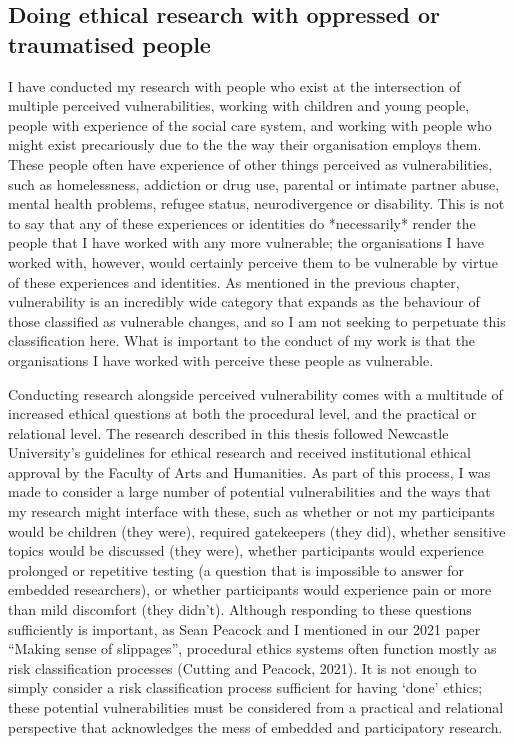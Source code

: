 \subsection{Doing ethical research with oppressed or traumatised people}
I have conducted my research with people who exist at the intersection of multiple perceived vulnerabilities, working with children and young people, people with experience of the social care system, and working with people who might exist precariously due to the the way their organisation employs them. These people often have experience of other things  perceived as vulnerabilities, such as homelessness,  addiction or drug use, parental or intimate partner abuse, mental health problems, refugee status, neurodivergence or disability. This is not to say that any of these experiences or identities do *necessarily* render the people that I have worked with any more vulnerable; the organisations I have worked with, however, would certainly perceive them to be vulnerable by virtue of these experiences and identities. As mentioned in the previous chapter, vulnerability is an incredibly wide category that expands as the behaviour of those classified as vulnerable changes, and so I am not seeking to perpetuate this classification here. What is important to the conduct of my work is that the organisations I have worked with perceive these people as vulnerable. 

Conducting research alongside perceived vulnerability comes with a multitude of increased ethical questions at both the procedural level, and the practical or relational level. The research described in this thesis followed Newcastle University’s guidelines for ethical research and received institutional ethical approval by the Faculty of Arts and Humanities. As part of this process, I was made to consider a large number of potential vulnerabilities and the ways that my research might interface with these, such as whether or not my participants would be children (they were), required gatekeepers (they did), whether sensitive topics would be discussed (they were), whether participants would experience prolonged or repetitive testing (a question that is impossible to answer for embedded researchers), or whether participants would experience pain or more than mild discomfort (they didn’t). Although responding to these questions sufficiently is important, as Sean Peacock and I mentioned in our 2021 paper “Making sense of slippages”, procedural ethics systems often function mostly as risk classification processes (Cutting and Peacock, 2021). It is not enough to simply consider a risk classification process sufficient for having ‘done’ ethics; these potential vulnerabilities must be considered from a practical and relational perspective that acknowledges the mess of embedded and participatory research.

